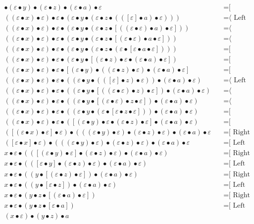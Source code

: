 \documentclass{article}
\begin{document}
\begin{align*}
[(ε • x) • ε • ε] • (ε • y) • (ε • z) • (ε • a) • ε
  & \quad \text{=[ Associativity ⟩}\\
((ε • x) • ε) • ε • (ε • y • (ε • z • (([ε] • a) • ε)))
  & \quad \text{=⟨ Left neutrality ]}\\
((ε • x) • ε) • ε • (ε • y • (ε • z • [((ε • ε) • a) • ε]))
  & \quad \text{=⟨ Associativity ]}\\
((ε • x) • ε) • ε • (ε • y • (ε • z • [(ε • ε) • a • ε]))
  & \quad \text{=⟨ Associativity ]}\\
((ε • x) • ε) • ε • (ε • y • (ε • z • (ε • [ε • a • ε])))
  & \quad \text{=[ Associativity ⟩}\\
((ε • x) • ε) • ε • (ε • y • [(ε • z) • ε • (ε • a) • ε])
  & \quad \text{=[ Associativity ⟩}\\
((ε • x) • ε) • ε • [(ε • y) • ((ε • z) • ε) • (ε • a) • ε]
  & \quad \text{=[ Associativity ⟩}\\
((ε • x) • ε) • ε • ((ε • y • (([ε] • z) • ε)) • (ε • a) • ε)
  & \quad \text{=⟨ Left neutrality ]}\\
((ε • x) • ε) • ε • ((ε • y • [((ε • ε) • z) • ε]) • (ε • a) • ε)
  & \quad \text{=⟨ Associativity ]}\\
((ε • x) • ε) • ε • ((ε • y • [(ε • ε) • z • ε]) • (ε • a) • ε)
  & \quad \text{=⟨ Associativity ]}\\
((ε • x) • ε) • ε • ((ε • y • (ε • [ε • z • ε])) • (ε • a) • ε)
  & \quad \text{=[ Associativity ⟩}\\
((ε • x) • ε) • ε • ([(ε • y) • ε • (ε • z) • ε] • (ε • a) • ε)
  & \quad \text{=[ Associativity ⟩}\\
([(ε • x) • ε] • ε) • (((ε • y) • ε) • (ε • z) • ε) • (ε • a) • ε
  & \quad \text{=[ Right neutrality ⟩}\\
([ε • x] • ε) • (((ε • y) • ε) • (ε • z) • ε) • (ε • a) • ε
  & \quad \text{=[ Left neutrality ⟩}\\
x • ε • (([(ε • y) • ε] • (ε • z) • ε) • (ε • a) • ε)
  & \quad \text{=[ Right neutrality ⟩}\\
x • ε • (([ε • y] • (ε • z) • ε) • (ε • a) • ε)
  & \quad \text{=[ Left neutrality ⟩}\\
x • ε • ((y • [(ε • z) • ε]) • (ε • a) • ε)
  & \quad \text{=[ Right neutrality ⟩}\\
x • ε • ((y • [ε • z]) • (ε • a) • ε)
  & \quad \text{=[ Left neutrality ⟩}\\
x • ε • (y • z • [(ε • a) • ε])
  & \quad \text{=[ Right neutrality ⟩}\\
x • ε • (y • z • [ε • a])
  & \quad \text{=[ Left neutrality ⟩}\\
(x • ε) • (y • z) • a
\end{align*}
\end{document}
